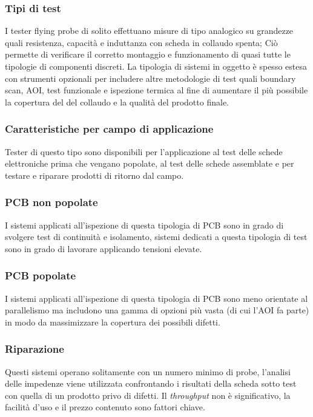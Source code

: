 \subsubsection{Tipi di test}

I tester flying probe di solito effettuano misure di tipo analogico su grandezze quali resistenza, capacità e induttanza con scheda in collaudo spenta; Ciò permette di verificare il corretto montaggio e funzionamento di quasi tutte le tipologie di componenti discreti.  
La tipologia di sistemi in oggetto è spesso estesa con strumenti opzionali per includere altre metodologie di test quali boundary 
scan, AOI, test funzionale e ispezione termica al fine di aumentare il più possibile la copertura del del collaudo e la qualità del prodotto finale. 

\subsubsection{Caratteristiche per campo di applicazione}
Tester di questo tipo sono disponibili per l'applicazione al test delle schede elettroniche prima che 
vengano popolate, al test delle schede assemblate e per testare e riparare prodotti di ritorno dal campo. 

\subsubsection{PCB non popolate}
I sistemi applicati all'ispezione di questa tipologia di PCB sono in grado di svolgere test di continuità e 
isolamento, sistemi dedicati a questa tipologia di test sono in grado di lavorare applicando tensioni elevate.

\subsubsection{PCB popolate}
I sistemi applicati all'ispezione di questa tipologia di PCB sono meno orientate al parallelismo ma
includono una gamma di opzioni più vasta (di cui l'AOI fa parte) in modo da massimizzare la copertura dei
possibili difetti.

\subsubsection{Riparazione}
Questi sistemi operano solitamente con un numero minimo di probe, l'analisi delle impedenze viene
utilizzata confrontando i risultati della scheda sotto test con quella di un prodotto privo di difetti. Il
\emph{throughput} non è significativo, la facilità d'uso e il prezzo contenuto sono fattori chiave.

